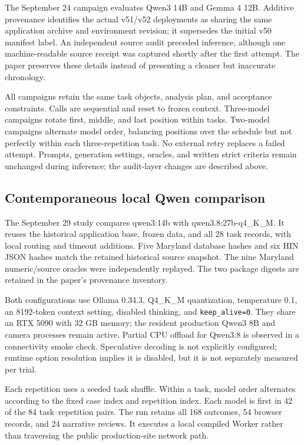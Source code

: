 \documentclass[10pt,twocolumn,letterpaper]{article}
\newcommand{\config}[1]{\textsf{#1}}
\begin{document}
The September 24 campaign evaluates Qwen3 14B and Gemma 4 12B. Additive provenance identifies the actual v51/v52 deployments as sharing the same application archive and environment revision; it supersedes the initial v50 manifest label. An independent source audit preceded inference, although one machine-readable source receipt was captured shortly after the first attempt. The paper preserves these details instead of presenting a cleaner but inaccurate chronology.

All campaigns retain the same task objects, analysis plan, and acceptance constraints. Calls are sequential and reset to frozen context. Three-model campaigns rotate first, middle, and last position within tasks. Two-model campaigns alternate model order, balancing positions over the schedule but not perfectly within each three-repetition task. No external retry replaces a failed attempt. Prompts, generation settings, oracles, and written strict criteria remain unchanged during inference; the audit-layer changes are described above.

\subsection{Contemporaneous local Qwen comparison}
The September 29 study compares \config{qwen3:14b} with \config{qwen3.8:27b-q4\_K\_M}. It reuses the historical application base, frozen data, and all 28 task records, with local routing and timeout additions. Five Maryland database hashes and six HIN JSON hashes match the retained historical source snapshot. The nine Maryland numeric/source oracles were independently replayed. The two package digests are retained in the paper's provenance inventory.

Both configurations use Ollama 0.34.3, Q4\_K\_M quantization, temperature 0.1, an 8192-token context setting, disabled thinking, and \texttt{keep\_alive=0}. They share an RTX 5090 with 32 GB memory; the resident production Qwen3 8B and camera processes remain active. Partial CPU offload for Qwen3.8 is observed in a connectivity smoke check. Speculative decoding is not explicitly configured; runtime option resolution implies it is disabled, but it is not separately measured per trial.

Each repetition uses a seeded task shuffle. Within a task, model order alternates according to the fixed case index and repetition index. Each model is first in 42 of the 84 task--repetition pairs. The run retains all 168 outcomes, 54 browser records, and 24 narrative reviews. It executes a local compiled Worker rather than traversing the public production-site network path.
\end{document}
